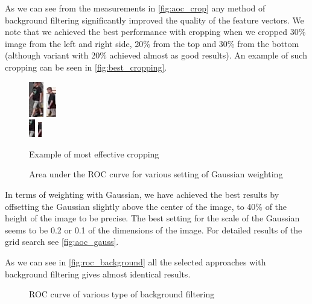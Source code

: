 As we can see from the measurements in \autoref{fig:aoc_crop} any method of background filtering significantly improved the quality of the feature vectors. We note that we achieved the best performance with cropping when we 
cropped 30\% image from the left and right side, 20\% from the top and 30\%
from the bottom (although variant with 20\% achieved almost as good results). An example of such cropping can be seen in
\autoref{fig:best_cropping}.

\begin{figure}
    \centering
    \includegraphics{img/0.png} \includegraphics{img/1.png} \\
    \includegraphics{img/0_crop.png} \includegraphics{img/1_crop.png}
    \caption{Example of most effective cropping}
    \label{fig:best_cropping}
\end{figure}

\begin{figure}
    \centering
    \def\svgwidth{\columnwidth}
    \Large
    \scalebox{0.6}{}
    \caption{Area under the ROC curve for various setting of Gaussian weighting}
    \label{fig:aoc_gauss}
\end{figure}

In terms of weighting with Gaussian, we have achieved the best results
by offsetting the Gaussian slightly above the center of the image, to 40\%
of the height of the image to be precise. The best setting for the scale
of the Gaussian seems to be 0.2 or 0.1 of the dimensions of the image. For detailed results
of the grid search see \autoref{fig:aoc_gauss}.

As we can see in \autoref{fig:roc_background} all the selected approaches
with background filtering gives almost identical results.

\begin{figure}[tb]
    \centering
    \def\svgwidth{\columnwidth}
    
    \caption{ROC curve of various type of background filtering}
    \label{fig:roc_background}
\end{figure}

